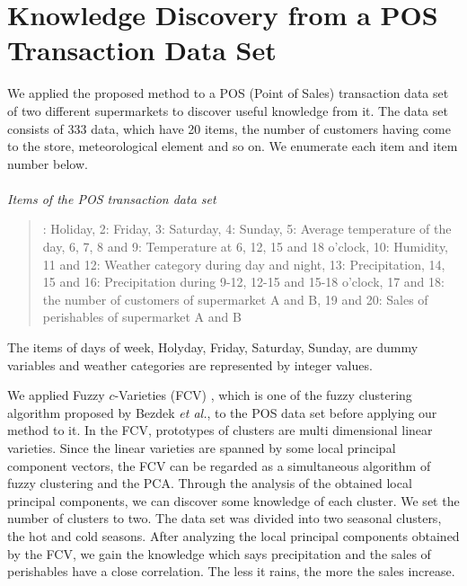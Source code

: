 \documentclass{article}
\begin{document}
\section{Knowledge Discovery from a POS Transaction Data Set}
%
We applied the proposed method to a POS (Point of Sales) transaction data set of two different supermarkets to discover useful knowledge from it. The data set consists of 333 data, which have 20 items, the number of customers having come to the store, meteorological element and so on. We enumerate each item and item number below. 
\\ \\
\noindent
{\it Items of the POS transaction data set}
\begin{quotation}
: Holiday, 2: Friday, 3: Saturday, 4: Sunday, 5: Average temperature of the day, 6, 7, 8 and 9: Temperature at 6, 12, 15 and 18 o'clock, 10: Humidity, 11 and 12: Weather category during day and night, 13: Precipitation, 14, 15 and 16: Precipitation during 9-12, 12-15 and 15-18 o'clock, 17 and 18: the number of customers of supermarket A and B, 19 and 20: Sales of perishables of supermarket A and B\end{quotation}

\noindent
The items of days of week, Holyday, Friday, Saturday, Sunday, are dummy variables and weather categories are represented by integer values. 

We applied Fuzzy $c$-Varieties (FCV) \cite{Bezdek}, which is one of the fuzzy clustering algorithm proposed by Bezdek {\it et al.}, to the POS data set before applying our method to it. In the FCV, prototypes of clusters are multi dimensional linear varieties. Since the linear varieties are spanned by some local principal component vectors, the FCV can be regarded as a simultaneous algorithm of fuzzy clustering and the PCA. Through the analysis of the obtained local principal components, we can discover some knowledge of each cluster. We set the number of clusters to two. The data set was divided into two seasonal clusters, the hot and cold seasons. After analyzing the local principal components obtained by the FCV, we gain the knowledge which says precipitation and the sales of perishables have a close correlation. The less it rains, the more the sales increase.
\end{document}
